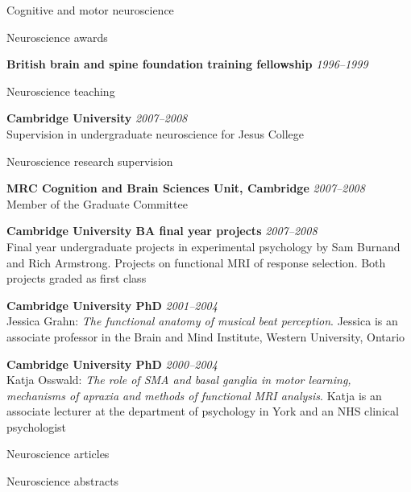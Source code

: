 \documentclass{cv}
\newcommand{\PlaceDateNote}[3]{{\bf #1} \hfill {\em #2} \\#3}
\newcommand{\CBU}{MRC Cognition and Brain Sciences Unit, Cambridge}
\begin{document}
\begin{cvSection}{Cognitive and motor neuroscience}

\begin{cvSubSection}{Neuroscience awards}

{\bf British brain and spine foundation training fellowship} \hfill {\em
1996--1999}

\end{cvSubSection}

\begin{cvSubSection}{Neuroscience teaching}

\PlaceDateNote{Cambridge University}{2007--2008}{
Supervision in undergraduate neuroscience for Jesus College}

\end{cvSubSection}

\begin{cvSubSection}{Neuroscience research supervision}

\PlaceDateNote{\CBU}{2007--2008}
{Member of the Graduate Committee}

\PlaceDateNote{Cambridge University BA final year projects}{2007--2008}
{Final year undergraduate projects in experimental psychology by Sam Burnand
and Rich Armstrong.  Projects on functional MRI of response selection.  Both
projects graded as first class}

\PlaceDateNote{Cambridge University PhD}{2001--2004}
{Jessica Grahn: {\em The functional anatomy of musical beat perception}.
Jessica is an associate professor in the Brain and Mind Institute, Western
University, Ontario}

\PlaceDateNote{Cambridge University PhD}{2000--2004}
{Katja Osswald: {\em The role of SMA and basal ganglia in motor learning,
mechanisms of apraxia and methods of functional MRI analysis}. Katja is an
associate lecturer at the department of psychology in York and an NHS clinical
psychologist}

\end{cvSubSection}

\begin{cvSubSection}{Neuroscience articles}

\printbibliography[heading=none,
    keyword=movethink,
    keyword=article,
notkeyword=omit]

\end{cvSubSection}

\begin{cvSubSection}{Neuroscience abstracts}

\printbibliography[heading=none,
    keyword=movethink,
    keyword=abstract,
notkeyword=omit]

\end{cvSubSection}

\end{cvSection}
\end{document}
